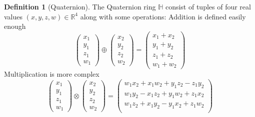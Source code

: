 \documentclass{amsart}
\theoremstyle{definition}
\newtheorem{definition}[theorem]{Definition}
\theoremstyle{remark}
\numberwithin{equation}{section}
\begin{document}
\begin{definition}[Quaternion]
  The Quaternion ring $\mathbb{H}$ consist of tuples of four real values $(x, y, z, w)\in\mathbb{R}^4$ along with some operations: Addition is defined easily enough
  \begin{equation}
    \begin{pmatrix}
      x_1 \\
      y_1 \\
      z_1 \\
      w_1
    \end{pmatrix} \oplus
    \begin{pmatrix}
      x_2 \\
      y_2 \\
      z_2 \\
      w_2
    \end{pmatrix} =
    \begin{pmatrix}
      x_1 + x_2 \\
      y_1 + y_2 \\
      z_1 + z_2 \\
      w_1 + w_2
    \end{pmatrix}
  \end{equation}
  Multiplication is more complex
  \begin{equation} \label{eqn:multiplication}
    \begin{pmatrix}
      x_1 \\
      y_1 \\
      z_1 \\
      w_1
    \end{pmatrix} \otimes 
    \begin{pmatrix}
      x_2 \\
      y_2 \\
      z_2 \\
      w_2
    \end{pmatrix} =
    \begin{pmatrix}
      w_1x_2 + x_1w_2 + y_1z_2 - z_1y_2 \\
      w_1y_2 - x_1z_2 + y_1w_2 + z_1x_2 \\
      w_1z_2 + x_1y_2 - y_1x_2 + z_1w_2 \\

\end{pmatrix}
\end{equation}
\end{definition}
\end{document}
